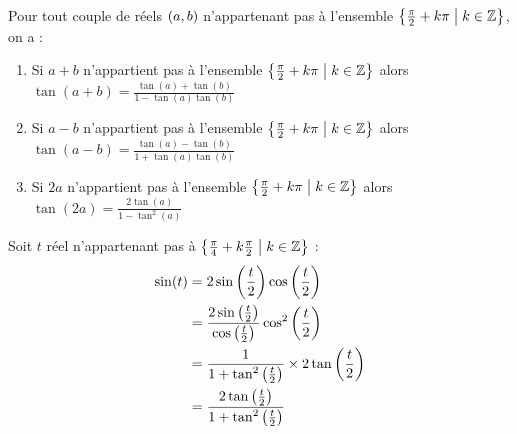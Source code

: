 \begin{formu}
    Pour tout couple de réels \(\left(a,b\right)\) n'appartenant pas à l'ensemble \(\left\lbrace\frac{\pi}{2}+k\pi\;\middle|\; k\in \mathbb{Z}\right\rbrace\), on a :
    \begin{enumerate}
        \item Si \(a+b\) n'appartient pas à l'ensemble \(\left\lbrace\frac{\pi}{2}+k\pi\;\middle|\; k\in \mathbb{Z}\right\rbrace\) alors \(\tan(a+b) = \frac{\tan(a)+\tan(b)}{1-\tan(a) \tan(b)}\)
        \item Si \(a-b\) n'appartient pas à l'ensemble \(\left\lbrace\frac{\pi}{2}+k\pi\;\middle|\; k\in \mathbb{Z}\right\rbrace\) alors \(\tan(a-b) = \frac{\tan(a)-\tan(b)}{1+\tan(a) \tan(b)}\)
        \item Si \(2a\)  n'appartient pas à l'ensemble \(\left\lbrace\frac{\pi}{2}+k\pi\;\middle|\; k\in \mathbb{Z}\right\rbrace\) alors \(\tan(2a) = \frac{2\tan(a)}{1-\tan^2(a)} \)
    \end{enumerate}
\end{formu}

\begin{exoex}
Soit \(t\) réel n'appartenant pas à \(\left\lbrace\frac{\pi}{4}+k\frac{\pi}{2}\;\middle|\; k\in \mathbb{Z}\right\rbrace\) : 
    \begin{align*}
        \sin(t) &= 2\sin\left(\frac{t}{2}\right)\cos\left(\frac{t}{2}\right) \\
        &= \frac{2\sin\left(\frac{t}{2}\right)}{\cos\left(\frac{t}{2}\right)}\cos^2\left(\frac{t}{2}\right)\\
        &= \frac{1}{1+\tan^2\left(\frac{t}{2}\right)}\times 2 \tan\left(\frac{t}{2}\right) \\
        &=\frac{2 \tan\left(\frac{t}{2}\right)}{1+\tan^2\left(\frac{t}{2}\right)} 
    \end{align*}
\end{exoex}